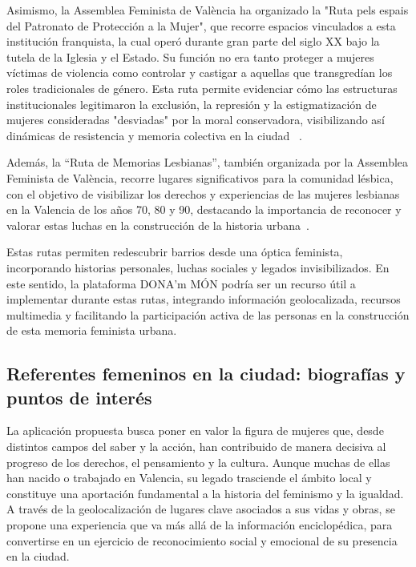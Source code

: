 Asimismo, la Assemblea Feminista de València ha organizado la "Ruta pels espais del Patronato de Protección a la Mujer", que recorre espacios vinculados a esta institución franquista, la cual operó durante gran parte del siglo XX bajo la tutela de la Iglesia y el Estado. Su función no era tanto proteger a mujeres víctimas de violencia como controlar y castigar a aquellas que transgredían los roles tradicionales de género. Esta ruta permite evidenciar cómo las estructuras institucionales legitimaron la exclusión, la represión y la estigmatización de mujeres consideradas "desviadas" por la moral conservadora, visibilizando así dinámicas de resistencia y memoria colectiva en la ciudad ~\cite{assemblea2023}.

Además, la ``Ruta de Memorias Lesbianas'', también organizada por la Assemblea Feminista de València, recorre lugares significativos para la comunidad lésbica, con el objetivo de visibilizar los derechos y experiencias de las mujeres lesbianas en la Valencia de los años 70, 80 y 90, destacando la importancia de reconocer y valorar estas luchas en la construcción de la historia urbana~\cite{assemblea2024}.

Estas rutas permiten redescubrir barrios desde una óptica feminista, incorporando historias personales, luchas sociales y legados invisibilizados. En este sentido, la plataforma DONA’m MÓN podría ser un recurso útil a implementar durante estas rutas, integrando información geolocalizada, recursos multimedia y facilitando la participación activa de las personas en la construcción de esta memoria feminista urbana. 


\subsection{Referentes femeninos en la ciudad: biografías y puntos de interés}

La aplicación propuesta busca poner en valor la figura de mujeres que, desde distintos campos del saber y la acción, han contribuido de manera decisiva al progreso de los derechos, el pensamiento y la cultura. Aunque muchas de ellas han nacido o trabajado en Valencia, su legado trasciende el ámbito local y constituye una aportación fundamental a la historia del feminismo y la igualdad. A través de la geolocalización de lugares clave asociados a sus vidas y obras, se propone una experiencia que va más allá de la información enciclopédica, para convertirse en un ejercicio de reconocimiento social y emocional de su presencia en la ciudad.

